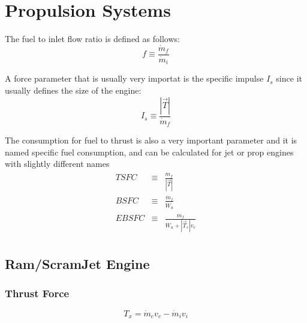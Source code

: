 \chapter{Propulsion Systems}
    
    The fuel to inlet flow ratio is defined as follows:
    \begin{equation}
        f \equiv \frac{\dot{m}_f}{\dot{m}_i}
    \end{equation}
    
 
    A force parameter that is usually very importat is the specific impulse $I_s$ since it usually defines the size of the engine:
    \begin{equation}
        I_s \equiv \frac{|\vec{T}|}{\dot{m}_f} 
    \end{equation}
    
    The consumption for fuel to thrust is also a very important parameter and it is named specific fuel consumption, and can be calculated for jet or prop engines with slightly different names 
    \begin{eqnarray}
       TSFC  &\equiv& \frac{\dot{m}_f}{|\vec{T}|} \\
       BSFC  &\equiv& \frac{\dot{m}_f}{\dot{W}_u} \\
       EBSFC &\equiv& \frac{\dot{m}_f}{\dot{W}_u + |\vec{T}_e|v_e} \\
    \end{eqnarray}
 


\newpage
\section{Ram/ScramJet Engine}
    \subsection{Thrust Force}
    \begin{equation}
        T_x = \dot{m}_e v_e - \dot{m}_i v_i
    \end{equation}
 
